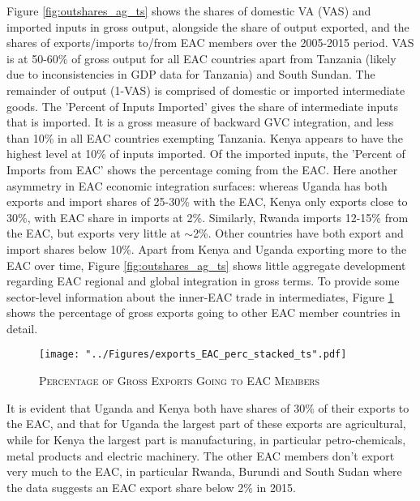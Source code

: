 \documentclass[a4paper]{article}
\begin{document}
Figure \ref{fig:outshares_ag_ts} shows the shares of domestic VA (VAS) and imported inputs in gross output, alongside the share of output exported, and the shares of exports/imports to/from EAC members over the 2005-2015 period. VAS is at 50-60\% of gross output for all EAC countries apart from Tanzania (likely due to inconsistencies in GDP data for Tanzania) and South Sundan. The remainder of output (1-VAS) is comprised of domestic or imported intermediate goods. The 'Percent of Inputs Imported' gives the share of intermediate inputs that is imported. It is a gross measure of backward GVC integration, and less than 10\% in all EAC countries exempting Tanzania. Kenya appears to have the highest level at 10\% of inputs imported. Of the imported inputs, the 'Percent of Imports from EAC' shows the percentage coming from the EAC. %
Here another asymmetry in EAC economic integration surfaces: whereas Uganda has both exports and import shares of 25-30\% with the EAC, Kenya only exports close to 30\%, with EAC share in imports at 2\%. Similarly, Rwanda imports 12-15\% from the EAC, but exports very little at $\sim$2\%. Other countries have both export and import shares below 10\%. Apart from Kenya and Uganda exporting more to the EAC over time, Figure \ref{fig:outshares_ag_ts} shows little aggregate development regarding EAC regional and global integration in gross terms. To provide some sector-level information about the inner-EAC trade in intermediates, Figure \ref{fig:exp_EAC_share} shows the percentage of gross exports going to other EAC member countries in detail. 

\begin{figure}[h!]
\centering
\caption{\label{fig:exp_EAC_share}\textsc{Percentage of Gross Exports Going to EAC Members}}
\texttt{[image: "../Figures/exports\_EAC\_perc\_stacked\_ts".pdf]} %
\vspace{-1cm}
\end{figure}
\FloatBarrier

It is evident that Uganda and Kenya both have shares of 30\% of their exports to the EAC, and that for Uganda the largest part of these exports are agricultural, while for Kenya the largest part is manufacturing, in particular petro-chemicals, metal products and electric machinery. The other EAC members don't export very much to the EAC, in particular Rwanda, Burundi and South Sudan where the data suggests an EAC export share below 2\% in 2015. 
\end{document}
